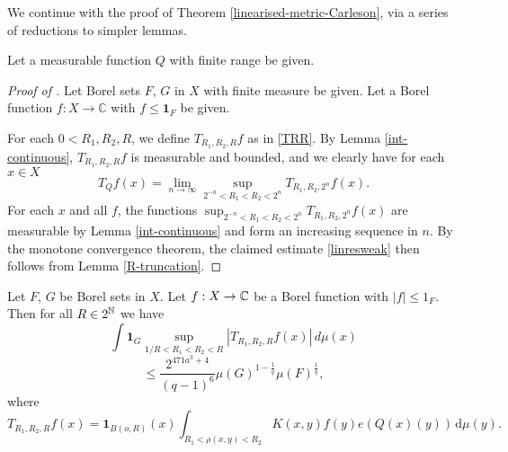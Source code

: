 We continue with the proof of Theorem \ref{linearised-metric-Carleson}, via a series of reductions to simpler lemmas.

Let a measurable function $Q$ with finite range be given.

\begin{proof}[Proof of ]
\leanok
{}
Let Borel sets $F$, $G$ in $X$ with finite measure be given. Let a Borel function $f: X \to \mathbb{C}$ with $f \le \mathbf{1}_F$ be given.

For each $0 < R_1,R_2,R$, we define $T_{R_1,R_2,R}f$ as in \eqref{TRR}.
By Lemma \ref{int-continuous},
$T_{R_1,R_2,R}f$
is measurable and bounded, and we clearly have for each $x \in X$
\[
    T_Q f(x) = \lim_{n \to \infty} \sup_{2^{-n} < R_1 < R_2 < 2^n} T_{R_1, R_2, 2^n}f(x).
\]
For each $x$ and all $f$, the functions $\sup_{2^{-n} < R_1 < R_2 < 2^n} T_{R_1, R_2, 2^n} f(x)$ are measurable by Lemma \ref{int-continuous} and form an increasing sequence in $n$. By the monotone convergence theorem, the claimed estimate \eqref{linresweak} then follows from Lemma \ref{R-truncation}.
\end{proof}

\begin{lemma}[R truncation]
    \label{R-truncation}
    \leanok

    Let $F$, $G$ be Borel sets in $X$. Let $f:X\to \mathbb{C}$ be a Borel function with $|f|\le 1_F$. Then for all $R\in 2^{\mathbb{N}}$ we have
    $$
        \int \mathbf{1}_G \sup_{1/R<R_1<R_2<R} |T_{R_1,R_2,R} f(x)|\, d\mu(x)
    $$
    \begin{equation} \label{Rcut}
        \le \frac{2^{471a^3+4}}{(q-1)^6} \mu(G)^{1-\frac{1}{q}} \mu(F)^{\frac{1}{q}},
    \end{equation}
    where
    \begin{equation}\label{TRR}
        T_{R_1,R_2,R} f(x)= \mathbf{1}_{B(o,R)}(x)
        \int_{R_1 < \rho(x,y) < R_2} K(x,y) f(y) e(Q(x)(y)) \, \mathrm{d}\mu(y) .
    \end{equation}
\end{lemma}

